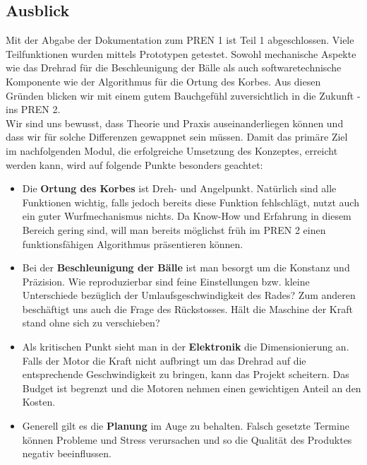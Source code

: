 \subsection{Ausblick}
Mit der Abgabe der Dokumentation zum PREN 1 ist Teil 1 abgeschlossen. Viele Teilfunktionen wurden mittels Prototypen getestet. Sowohl mechanische Aspekte wie das Drehrad für die Beschleunigung der Bälle als auch softwaretechnische Komponente wie der Algorithmus für die Ortung des Korbes. Aus diesen Gründen blicken wir mit einem gutem Bauchgefühl zuversichtlich in die Zukunft - ins PREN 2. \\
Wir sind uns bewusst, dass Theorie und Praxis auseinanderliegen können und dass wir für solche Differenzen gewappnet sein müssen. Damit das primäre Ziel im nachfolgenden Modul, die erfolgreiche Umsetzung des Konzeptes, erreicht werden kann, wird auf folgende Punkte besonders geachtet:

\begin{itemize}
	\item Die \textbf{Ortung des Korbes} ist Dreh- und Angelpunkt. Natürlich sind alle Funktionen wichtig, falls jedoch bereits diese Funktion fehlschlägt, nutzt auch ein guter Wurfmechanismus nichts. Da Know-How und Erfahrung in diesem Bereich gering sind, will man bereits möglichst früh im PREN 2 einen funktionsfähigen Algorithmus präsentieren können.
	
	\item Bei der \textbf{Beschleunigung der Bälle} ist man besorgt um die Konstanz und Präzision. Wie reproduzierbar sind feine Einstellungen bzw. kleine Unterschiede bezüglich der Umlaufsgeschwindigkeit des Rades? Zum anderen beschäftigt uns auch die Frage des Rückstosses. Hält die Maschine der Kraft stand ohne sich zu verschieben?
	
	\item Als kritischen Punkt sieht man in der \textbf{Elektronik} die Dimensionierung an. Falls der Motor die Kraft nicht aufbringt um das Drehrad auf die entsprechende Geschwindigkeit zu bringen, kann das Projekt scheitern. Das Budget ist begrenzt und die Motoren nehmen einen gewichtigen Anteil an den Kosten.
	
	\item Generell gilt es die \textbf{Planung} im Auge zu behalten. Falsch gesetzte Termine können Probleme und Stress verursachen und so die Qualität des Produktes negativ beeinflussen.
\end{itemize}